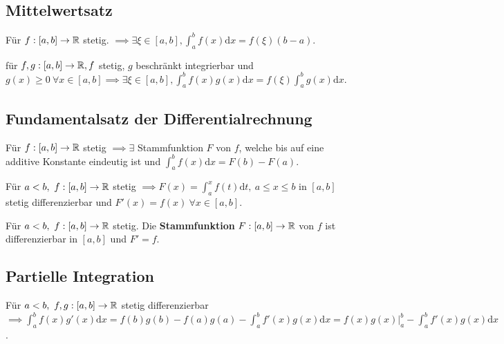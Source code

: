 \subsection{Mittelwertsatz}
Für $f:[a,b] \to \mathbb{R}$ stetig. $\implies \exists \xi \in [a,b], \int_{a}^{b} f(x) \mathrm{d}x = f(\xi)(b-a)$.
\begin{compactitem}
\item für $f,g :[a,b] \to \mathbb{R}, f$ stetig, $g$ beschränkt integrierbar und $g(x) \ge 0 \ \forall x \in [a,b] \implies \exists \xi \in [a,b], \int_{a}^{b} f(x)g(x) \mathrm{d}x = f(\xi) \int_{a}^{b} g(x)\mathrm{d}x$.
\end{compactitem}

\subsection{Fundamentalsatz der Differentialrechnung}
Für $f:[a,b] \to \mathbb{R}$ stetig $\implies \exists$ Stammfunktion $F$ von $f$, welche bis auf eine additive Konstante eindeutig ist und $\int_{a}^{b} f(x) \mathrm{d}x = F(b) - F(a)$.
\begin{compactitem}
    \item Für $a < b, \ f:[a,b] \to \mathbb{R}$ stetig $\implies F(x) = \int_{a}^{x} f(t) \mathrm{d}t, \ a \le x \le b$ in $[a, b]$ stetig differenzierbar und $F'(x) = f(x) \ \forall x \in [a, b]$.
    \item Für $a < b, \ f:[a,b] \to \mathbb{R}$ stetig. Die \textbf{Stammfunktion} $F: [a,b] \to \mathbb{R}$ von $f$ ist differenzierbar in $[a,b]$ und $F'=f$.
\end{compactitem}

\subsection{Partielle Integration}
Für $a < b,\ f,g: [a,b] \to \mathbb{R}$ stetig differenzierbar $\implies \int_{a}^{b} f(x)g'(x) \mathrm{d}x = f(b)g(b) - f(a)g(a) - \int_{a}^{b} f'(x)g(x) \mathrm{d}x  = f(x)g(x)|_a^b - \int_{a}^{b} f'(x)g(x) \mathrm{d}x$.


